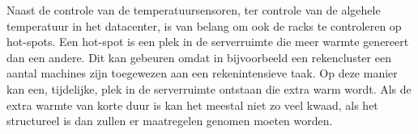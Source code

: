Naast de controle van de temperatuursensoren, ter controle van de algehele temperatuur in het datacenter, is van belang om ook de racks te controleren op hot-spots. Een hot-spot is een plek in de serverruimte die meer warmte genereert dan een andere. Dit kan gebeuren omdat in bijvoorbeeld een rekencluster een aantal machines zijn toegewezen aan een rekenintensieve taak. Op deze manier kan een, tijdelijke, plek in de serverruimte ontstaan die extra warm wordt. Als de extra warmte van korte duur is kan het meestal niet zo veel kwaad, als het structureel is dan zullen er maatregelen genomen moeten worden.


